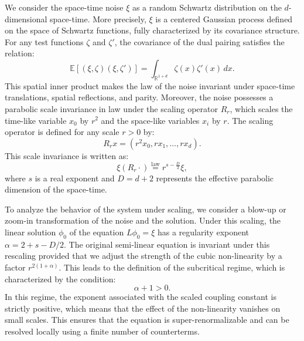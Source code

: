 We consider the space-time noise $\xi$ as a random Schwartz distribution on the $d$-dimensional space-time. More precisely, $\xi$ is a centered Gaussian process defined on the space of Schwartz functions, fully characterized by its covariance structure. For any test functions $\zeta$ and $\zeta'$, the covariance of the dual pairing satisfies the relation:
\begin{equation}
\mathbb{E} [(\xi, \zeta)(\xi, \zeta')] = \int_{\mathbb{R}^{1+d}} \zeta(x) \zeta'(x) \, dx.
\end{equation}
This spatial inner product makes the law of the noise invariant under space-time translations, spatial reflections, and parity. Moreover, the noise possesses a parabolic scale invariance in law under the scaling operator $R_r$, which scales the time-like variable $x_0$ by $r^2$ and the space-like variables $x_i$ by $r$. The scaling operator is defined for any scale $r > 0$ by:
\begin{equation}
R_r x = (r^2 x_0, r x_1, \dots, r x_d).
\end{equation}
This scale invariance is written as:
\begin{equation}
\xi(R_r \cdot) \stackrel{\text{law}}{=} r^{s - \frac{D}{2}} \xi,
\end{equation}
where $s$ is a real exponent and $D = d + 2$ represents the effective parabolic dimension of the space-time.

To analyze the behavior of the system under scaling, we consider a blow-up or zoom-in transformation of the noise and the solution. Under this scaling, the linear solution $\phi_0$ of the equation $L\phi_0 = \xi$ has a regularity exponent $\alpha = 2 + s - D/2$. The original semi-linear equation is invariant under this rescaling provided that we adjust the strength of the cubic non-linearity by a factor $r^{2(1 + \alpha)}$. This leads to the definition of the subcritical regime, which is characterized by the condition:
\begin{equation}
\alpha + 1 > 0.
\end{equation}
In this regime, the exponent associated with the scaled coupling constant is strictly positive, which means that the effect of the non-linearity vanishes on small scales. This ensures that the equation is super-renormalizable and can be resolved locally using a finite number of counterterms.


